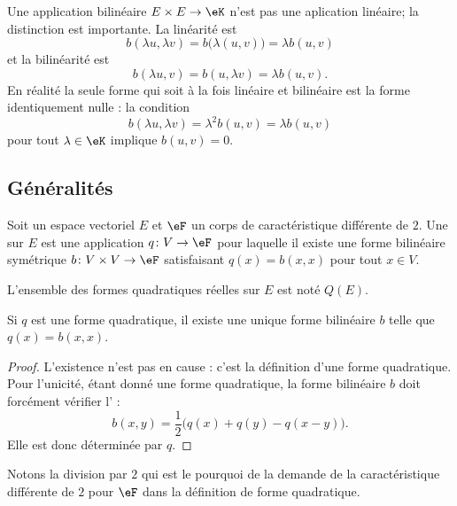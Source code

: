 \begin{normaltext}
    Une application bilinéaire \( E\times E\to \eK\) n'est pas une aplication linéaire; la distinction est importante. La linéarité est
    \begin{equation}
        b(\lambda u,\lambda v)= b\big( \lambda(u,v) \big)=\lambda b(u,v)
    \end{equation}
    et la bilinéarité est
    \begin{equation}
        b(\lambda u,v)=b(u,\lambda v)=\lambda b(u,v).
    \end{equation}
    En réalité la seule forme qui soit à la fois linéaire et bilinéaire est la forme identiquement nulle : la condition
    \begin{equation}
        b(\lambda u,\lambda v)=\lambda^2b(u,v)=\lambda b(u,v)
    \end{equation}
    pour tout \( \lambda\in \eK\) implique \( b(u,v)=0\).
\end{normaltext}

\subsection{Généralités}

\begin{definition}   \label{DefBSIoouvuKR}
    Soit un espace vectoriel \( E\) et \( \eF\) un corps de caractéristique différente de \( 2\). Une  sur \( E\) est une application \( q\colon V\to \eF\) pour laquelle il existe une forme bilinéaire symétrique \( b\colon V\times V\to \eF\) satisfaisant \( q(x)=b(x,x)\) pour tout \( x\in V\).

    L'ensemble des formes quadratiques réelles sur \( E\) est noté \( Q(E)\).
\end{definition}

\begin{lemma}       \label{LEMooLKNTooSfLSHt}
    Si \( q\) est une forme quadratique, il existe une unique forme bilinéaire \( b\) telle que \( q(x)=b(x,x)\).
\end{lemma}

\begin{proof}
    L'existence n'est pas en cause : c'est la définition d'une forme quadratique. Pour l'unicité, étant donné une forme quadratique, la forme bilinéaire \( b\) doit forcément vérifier l' :
\begin{equation}    \label{EqMrbsop}
    b(x,y)=\frac{ 1 }{2}\big( q(x)+q(y)-q(x-y) \big).
\end{equation}
Elle est donc déterminée par \( q\).
\end{proof}
Notons la division par \( 2\) qui est le pourquoi de la demande de la caractéristique différente de \( 2\) pour \( \eF\) dans la définition de forme quadratique.

